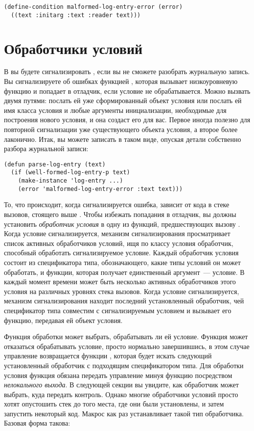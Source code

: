 \begin{lstlisting}
(define-condition malformed-log-entry-error (error)
  ((text :initarg :text :reader text)))
\end{lstlisting}

\section{Обработчики условий}

В  вы будете сигнализировать , если
вы не сможете разобрать журнальную запись. Вы сигнализируете об ошибках функцией
, которая вызывает низкоуровневую функцию  и попадает в отладчик,
если условие не обрабатывается. Можно вызвать  двумя путями: послать ей уже
сформированный объект условия или послать ей имя класса условия и любые аргументы
инициализации, необходимые для построения нового условия, и она создаст его для вас.
Первое иногда полезно для повторной сигнализации уже существующего объекта условия, а
второе более лаконично. Итак, вы можете записать  в таком виде,
опуская детали собственно разбора журнальной записи:

\begin{lstlisting}
(defun parse-log-entry (text)
  (if (well-formed-log-entry-p text)
    (make-instance 'log-entry ...)
    (error 'malformed-log-entry-error :text text)))
\end{lstlisting}

То, что происходит, когда сигнализируется ошибка, зависит от кода в стеке вызовов,
стоящего выше . Чтобы избежать попадания в отладчик, вы должны
установить \textit{обработчик условия} в одну из функций, предшествующих вызову
. Когда условие сигнализируется, механизм сигнализирования
просматривает список активных обработчиков условий, ищя по классу условия обработчик,
способный обработать сигнализируемое условие. Каждый обработчик условия состоит из
спецификатора типа, обозначающего, какие типы условий он может обработать, и функции,
которая получает единственный аргумент~--- условие. В каждый момент времени может быть
несколько активных обработчиков этого условия на различных уровнях стека вызовов. Когда
условие сигнализируется, механизм сигнализирования находит последний установленный
обработчик, чей спецификатор типа совместим с сигнализируемым условием и вызывает его
функцию, передавая ей объект условия.

Функция обработки может выбрать, обрабатывать ли ей условие. Функция может отказаться
обрабатывать условие, просто нормально завершившись, в этом случае управление возвращается
функции , которая будет искать следующий установленный обработчик с
подходящим спецификатором типа. Для обработки условия функция обязана передать управление
минуя функцию  посредством \textit{нелокального выхода}. В следующей секции
вы увидите, как обработчик может выбрать, куда передать контроль. Однако многие
обработчики условий просто хотят опустошить стек до того места, где они были установлены,
и затем запустить некоторый код. Макрос  как раз устанавливает такой
тип обработчика. Базовая форма  такова:


